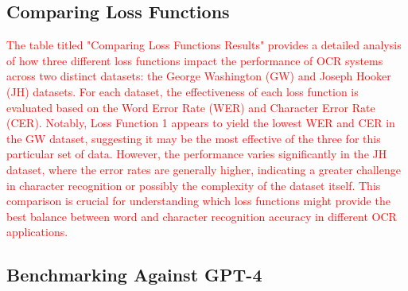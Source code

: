 \subsection{Comparing Loss Functions}
\label{subsec:5_comparing_loss_functions}

\textcolor{red}{The table titled "Comparing Loss Functions Results" provides a detailed analysis of how three different loss functions impact the performance of OCR systems across two distinct datasets: the George Washington (GW) and Joseph Hooker (JH) datasets. For each dataset, the effectiveness of each loss function is evaluated based on the Word Error Rate (WER) and Character Error Rate (CER). Notably, Loss Function 1 appears to yield the lowest WER and CER in the GW dataset, suggesting it may be the most effective of the three for this particular set of data. However, the performance varies significantly in the JH dataset, where the error rates are generally higher, indicating a greater challenge in character recognition or possibly the complexity of the dataset itself. This comparison is crucial for understanding which loss functions might provide the best balance between word and character recognition accuracy in different OCR applications.}


\subsection{Benchmarking Against GPT-4}
\label{subsec:5_benchmarking_against_gpt-4}


